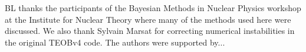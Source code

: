 \documentclass[prd,aps,letter,twocolumn,floatfix,notitlepage,nofootinbib]{revtex4-1}
\begin{document}
\begin{acknowledgments}

BL thanks the participants of the Bayesian Methods in Nuclear Physics workshop at the Institute for Nuclear Theory where many of the methods used here were discussed. We also thank Sylvain Marsat for correcting numerical instabilities in the original TEOBv4 code. The authors were supported by... 

\end{acknowledgments}


%     
  
\end{document}
